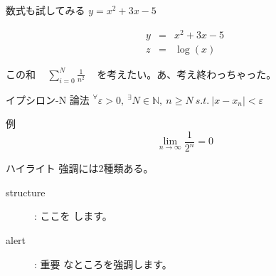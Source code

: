 \documentclass[dvipdfmx, 12pt]{beamer}  %
\begin{document}
\begin{frame}{数式も試してみる}
  $y = x^2 + 3x -5$

  \begin{eqnarray*}
    y &=& x^2 + 3x -5 \\
    z &=& \log(x)
  \end{eqnarray*}

  この和 ~ $ {\displaystyle
    \sum_{i=0}^{N} \frac{1}{n^2}
  } $ ~ を考えたい。あ、考え終わっちゃった。

  \begin{block}{ イプシロン-N 論法 }
    $ {\displaystyle
      {}^{\forall} \varepsilon > 0, ~ {}^{\exists} N \in \mathbb{N}, ~ n \geq N ~
      s.t. ~ | x - x_n | < \varepsilon
    } $
  \end{block}

  \begin{exampleblock}{例}
    \begin{displaymath}
      \lim_{n \rightarrow \infty} \frac{1}{2^n} = 0
    \end{displaymath}
  \end{exampleblock}

\end{frame}

\begin{frame}{ハイライト}
  強調には2種類ある。

  \begin{description}
    \item[structure]: ここを  します。
    \item[alert]: \alert{重要} なところを強調します。
  \end{description}
\end{frame}
\end{document}
